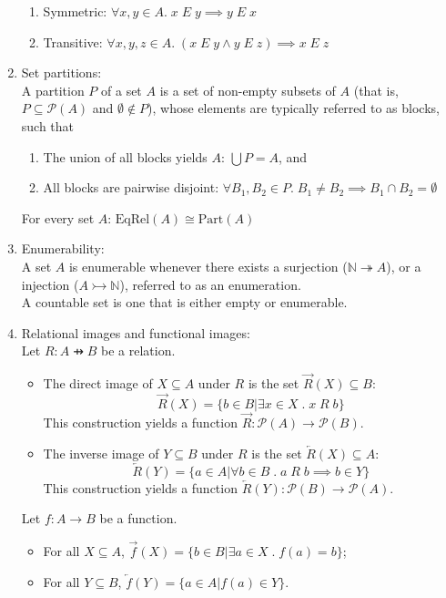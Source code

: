 \documentclass{article}
\begin{document}
\begin{enumerate}
\begin{enumerate}[label=(\arabic*),topsep=0pt]
            \item Symmetric: $\forall x, y\in A.\; x\;E\;y\implies y\;E\;x$
            \item Transitive: $\forall x, y, z\in A.\;(x\;E\;y\wedge y\;E\;z)\implies x\;E\;z$
        \end{enumerate}
    \item Set partitions:\\
        A partition $P$ of a set $A$ is a set of non-empty subsets of $A$ (that is, $P\subseteq\mathcal{P}(A)$ and $\emptyset\notin P$), whose elements are typically referred to as blocks, such that
        \begin{enumerate}[label=(\arabic*),topsep=0pt]
            \item The union of all blocks yields $A$: $\bigcup P=A$, and
            \item All blocks are pairwise disjoint: $\forall B_1, B_2\in P.\;B_1\neq B_2\implies B_1\cap B_2=\emptyset$
        \end{enumerate}
        For every set $A$: $\text{EqRel}(A)\cong\text{Part}(A)$
    \item Enumerability:\\
        A set $A$ is enumerable whenever there exists a surjection ($\mathbb{N}\twoheadrightarrow A$), or a injection ($A\rightarrowtail\mathbb{N}$), referred to as an enumeration.\\
        A countable set is one that is either empty or enumerable.
    \item Relational images and functional images:\\
        Let $R:A\pfun B$ be a relation.
        \begin{itemize}[label={-},topsep=0pt]
            \item The direct image of $X\subseteq A$ under $R$ is the set $\overrightarrow{R}(X)\subseteq B$:
                $$\overrightarrow{R}(X)=\{b\in B|\exists x\in X\;.\;x\;R\;b\}$$
                This construction yields a function $\overrightarrow{R}:\mathcal{P}(A)\to\mathcal{P}(B)$.
            \item The inverse image of $Y\subseteq B$ under $R$ is the set $\overleftarrow{R}(X)\subseteq A$:
                $$\overleftarrow{R}(Y)=\{a\in A|\forall b\in B\;.\;a\;R\;b\implies b\in Y\}$$
                This construction yields a function $\overleftarrow{R}(Y):\mathcal{P}(B)\to\mathcal{P}(A)$.
        \end{itemize}
        Let $f:A\to B$ be a function.
        \begin{itemize}[label={-},topsep=0pt]
            \item For all $X\subseteq A$, $\overrightarrow{f}(X)=\{b\in B|\exists a\in X\;.\;f(a)=b\}$;
            \item For all $Y\subseteq B$, $\overleftarrow{f}(Y)=\{a\in A|f(a)\in Y\}$.
        \end{itemize}
\end{enumerate}
\end{document}

